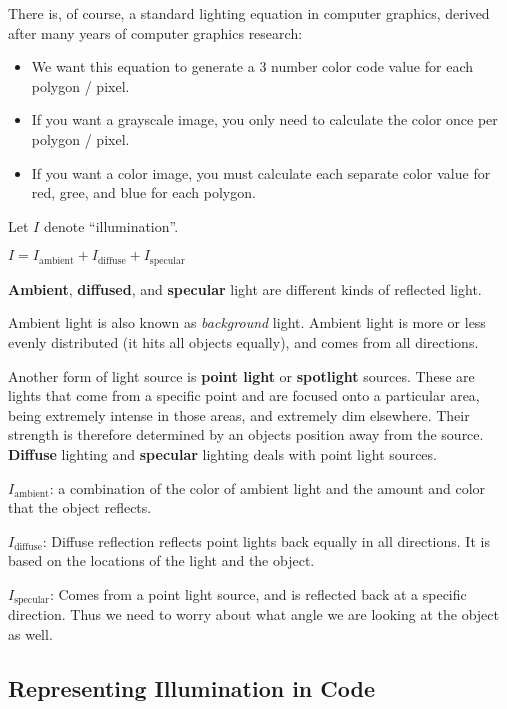 \documentclass[11pt,fleqn]{article}
\theoremstyle{definition}
\begin{document}
There is, of course, a standard lighting equation in computer graphics, derived after
many years of computer graphics research:

\begin{itemize}
    \item We want this equation to generate a 3 number color code value for each
        polygon / pixel.
    \item If you want a grayscale image, you only need to calculate the color once
        per polygon / pixel.
    \item If you want a color image, you must calculate each separate color value for
        red, gree, and blue for each polygon.
\end{itemize}

Let $I$ denote ``illumination''.

\begin{center}
    $I = I_{\text{ambient}} + I_{\text{diffuse}} + I_{\text{specular}}$
\end{center}

\textbf{Ambient}, \textbf{diffused}, and \textbf{specular} light are different kinds
of reflected light.

Ambient light is also known as \textit{background} light. Ambient light is more or
less evenly distributed (it hits all objects equally), and comes from all directions.

Another form of light source is \textbf{point light} or \textbf{spotlight} sources.
These are lights that come from a specific point and are focused onto a particular
area, being extremely intense in those areas, and extremely dim elsewhere. Their
strength is therefore determined by an objects position away from the source.
\textbf{Diffuse} lighting and \textbf{specular} lighting deals with point light
sources.

$I_{\text{ambient}}$: a combination of the color of ambient light and the amount and
color that the object reflects.

$I_{\text{diffuse}}$: Diffuse reflection reflects point lights back equally in all
directions. It is based on the locations of the light and the object.

$I_{\text{specular}}$: Comes from a point light source, and is reflected back at a
specific direction. Thus we need to worry about what angle we are looking at the
object as well.

\subsection{Representing Illumination in Code}
\end{document}
